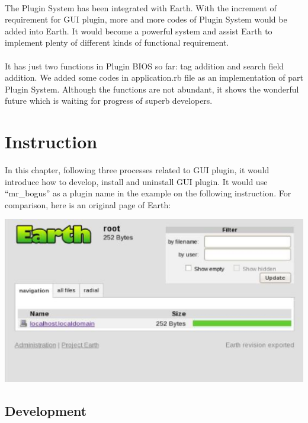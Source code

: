 \documentclass[10pt,oneside]{article}
\begin{document}
\\
The Plugin System has been integrated with Earth. With the increment of requirement for GUI plugin, more and more codes of Plugin System would be added into Earth. It would become a powerful system and assist Earth to implement plenty of different kinds of functional requirement.\\
\\
It has just two functions in Plugin BIOS so far: tag addition and search field addition. We added some codes in application.rb file as an implementation of part Plugin System. Although the functions are not abundant, it shows the wonderful future which is waiting for progress of superb developers.\\

\section{Instruction}
 
In this chapter, following three processes related to GUI plugin, it would introduce how to develop, install and uninstall GUI plugin. It would use “mr\_bogus” as a plugin name in the example on the following instruction. For comparison, here is an original page of Earth:\\
\begin{center}
 \includegraphics[width=150mm]{fig/instruction-1.eps}
\end{center}


\subsection{Development}
\end{document}
